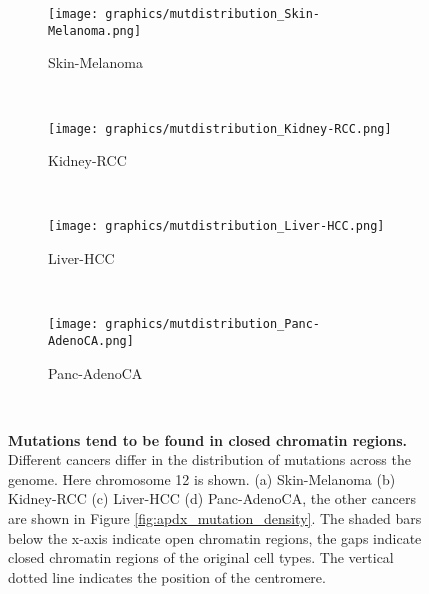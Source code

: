 \begin{figure}[ht!]
    \begin{subfigure}{.5\textwidth}
    \texttt{[image: graphics/mutdistribution\_Skin-Melanoma.png]}
    \caption{Skin-Melanoma}
    \label{fig:density_skin}
    \end{subfigure}
    ~
    \begin{subfigure}{.5\textwidth}
    
    \texttt{[image: graphics/mutdistribution\_Kidney-RCC.png]}
    \caption{Kidney-RCC}
    \label{fig:density_kidney}
    \end{subfigure} \\
    \vspace{0.5cm}
    
    \begin{subfigure}{.5\textwidth}
    \texttt{[image: graphics/mutdistribution\_Liver-HCC.png]}
    \caption{Liver-HCC}
    \label{fig:density_liver}
    \end{subfigure}
    ~
    \begin{subfigure}{.5\textwidth}
    \texttt{[image: graphics/mutdistribution\_Panc-AdenoCA.png]}
    \caption{Panc-AdenoCA}
    \label{fig:density_panc_adenoca}
    \end{subfigure} \\
    
    \caption{\textbf{Mutations tend to be found in closed chromatin regions.} Different cancers differ in the distribution of mutations across the genome. Here chromosome 12 is shown. (a) Skin-Melanoma (b) Kidney-RCC (c) Liver-HCC (d) Panc-AdenoCA, the other cancers are shown in Figure \ref{fig:apdx_mutation_density}. The shaded bars below the x-axis indicate open chromatin regions, the gaps indicate closed chromatin regions of the original cell types. The vertical dotted line indicates the position of the centromere.}
    \label{fig:mutation_density}
\end{figure}